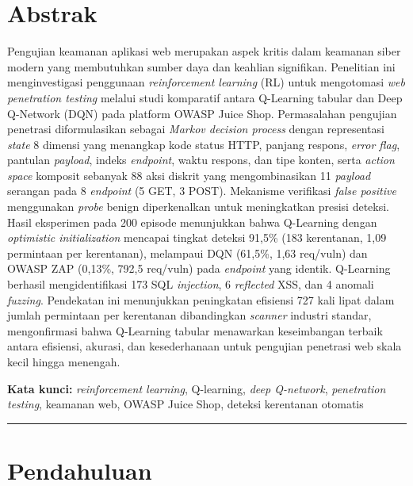 \documentclass[a4paper,12pt]{article}
\begin{document}
\section*{Abstrak}
Pengujian keamanan aplikasi web merupakan aspek kritis dalam keamanan siber modern yang membutuhkan sumber daya dan keahlian signifikan. Penelitian ini menginvestigasi penggunaan \textit{reinforcement learning} (RL) untuk mengotomasi \textit{web penetration testing} melalui studi komparatif antara Q-Learning tabular dan Deep Q-Network (DQN) pada platform OWASP Juice Shop. Permasalahan pengujian penetrasi diformulasikan sebagai \textit{Markov decision process} dengan representasi \textit{state} 8 dimensi yang menangkap kode status HTTP, panjang respons, \textit{error flag}, pantulan \textit{payload}, indeks \textit{endpoint}, waktu respons, dan tipe konten, serta \textit{action space} komposit sebanyak 88 aksi diskrit yang mengombinasikan 11 \textit{payload} serangan pada 8 \textit{endpoint} (5 GET, 3 POST). Mekanisme verifikasi \textit{false positive} menggunakan \textit{probe} benign diperkenalkan untuk meningkatkan presisi deteksi. Hasil eksperimen pada 200 episode menunjukkan bahwa Q-Learning dengan \textit{optimistic initialization} mencapai tingkat deteksi 91,5\% (183 kerentanan, 1,09 permintaan per kerentanan), melampaui DQN (61,5\%, 1,63 req/vuln) dan OWASP ZAP (0,13\%, 792,5 req/vuln) pada \textit{endpoint} yang identik. Q-Learning berhasil mengidentifikasi 173 SQL \textit{injection}, 6 \textit{reflected} XSS, dan 4 anomali \textit{fuzzing}. Pendekatan ini menunjukkan peningkatan efisiensi 727 kali lipat dalam jumlah permintaan per kerentanan dibandingkan \textit{scanner} industri standar, mengonfirmasi bahwa Q-Learning tabular menawarkan keseimbangan terbaik antara efisiensi, akurasi, dan kesederhanaan untuk pengujian penetrasi web skala kecil hingga menengah.

\medskip
\noindent\textbf{Kata kunci:} \textit{reinforcement learning}, Q-learning, \textit{deep Q-network}, \textit{penetration testing}, keamanan web, OWASP Juice Shop, deteksi kerentanan otomatis

\begin{center}
\rule{0.8\textwidth}{0.5pt}
\end{center}

\section{Pendahuluan}
\end{document}
